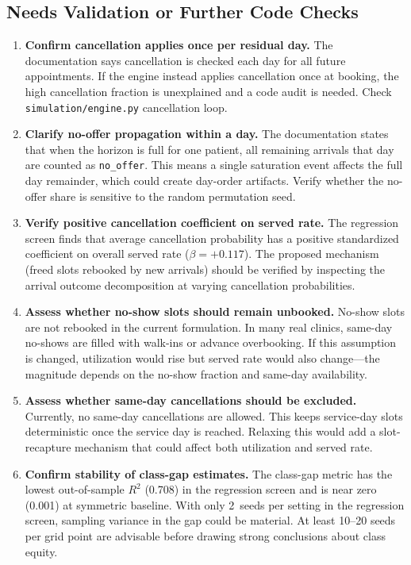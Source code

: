 \documentclass[11pt]{article}
\begin{document}
\subsection{Needs Validation or Further Code Checks}

\begin{checkenv}
\begin{enumerate}
\item \textbf{Confirm cancellation applies once per residual day.}
The documentation says cancellation is checked each day for all future
appointments. If the engine instead applies cancellation once at booking,
the high cancellation fraction is unexplained and a code audit is needed.
Check \texttt{simulation/engine.py} cancellation loop.

\item \textbf{Clarify no-offer propagation within a day.}
The documentation states that when the horizon is full for one patient,
all remaining arrivals that day are counted as \texttt{no\_offer}. This
means a single saturation event affects the full day remainder, which
could create day-order artifacts. Verify whether the no-offer share is
sensitive to the random permutation seed.

\item \textbf{Verify positive cancellation coefficient on served rate.}
The regression screen finds that average cancellation probability has a
positive standardized coefficient on overall served rate ($\beta = +0.117$).
The proposed mechanism (freed slots rebooked by new arrivals) should be
verified by inspecting the arrival outcome decomposition at varying
cancellation probabilities.

\item \textbf{Assess whether no-show slots should remain unbooked.}
No-show slots are not rebooked in the current formulation. In many
real clinics, same-day no-shows are filled with walk-ins or advance
overbooking. If this assumption is changed, utilization would rise but
served rate would also change---the magnitude depends on the no-show
fraction and same-day availability.

\item \textbf{Assess whether same-day cancellations should be excluded.}
Currently, no same-day cancellations are allowed. This keeps service-day
slots deterministic once the service day is reached. Relaxing this would
add a slot-recapture mechanism that could affect both utilization and
served rate.

\item \textbf{Confirm stability of class-gap estimates.}
The class-gap metric has the lowest out-of-sample $R^2$ (0.708) in the
regression screen and is near zero (0.001) at symmetric baseline. With
only 2~seeds per setting in the regression screen, sampling variance in
the gap could be material. At least 10--20 seeds per grid point are
advisable before drawing strong conclusions about class equity.


\end{enumerate}
\end{checkenv}
\end{document}
